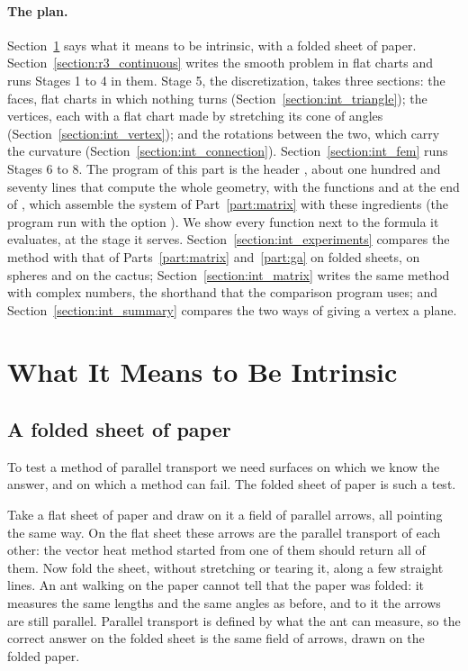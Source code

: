 \paragraph{The plan.} Section~\ref{section:int_meaning} says what it means to be intrinsic, with a folded sheet of paper. Section~\ref{section:r3_continuous} writes the smooth problem in flat charts and runs Stages 1 to 4 in them. Stage 5, the discretization, takes three sections: the faces, flat charts in which nothing turns (Section~\ref{section:int_triangle}); the vertices, each with a flat chart made by stretching its cone of angles (Section~\ref{section:int_vertex}); and the rotations between the two, which carry the curvature (Section~\ref{section:int_connection}). Section~\ref{section:int_fem} runs Stages 6 to 8. The program of this part is the header , about one hundred and seventy lines that compute the whole geometry, with the functions  and  at the end of , which assemble the system of Part~\ref{part:matrix} with these ingredients (the program  run with the option ). We show every function next to the formula it evaluates, at the stage it serves. Section~\ref{section:int_experiments} compares the method with that of Parts~\ref{part:matrix} and~\ref{part:ga} on folded sheets, on spheres and on the cactus; Section~\ref{section:int_matrix} writes the same method with complex numbers, the shorthand that the comparison program  uses; and Section~\ref{section:int_summary} compares the two ways of giving a vertex a plane.

\section{What It Means to Be Intrinsic}
\label{section:int_meaning}

\subsection{A folded sheet of paper}

To test a method of parallel transport we need surfaces on which we know the answer, and on which a method can fail. The folded sheet of paper is such a test.

Take a flat sheet of paper and draw on it a field of parallel arrows, all pointing the same way. On the flat sheet these arrows are the parallel transport of each other: the vector heat method started from one of them should return all of them. Now fold the sheet, without stretching or tearing it, along a few straight lines. An ant walking on the paper cannot tell that the paper was folded: it measures the same lengths and the same angles as before, and to it the arrows are still parallel. Parallel transport is defined by what the ant can measure, so the correct answer on the folded sheet is the same field of arrows, drawn on the folded paper.

